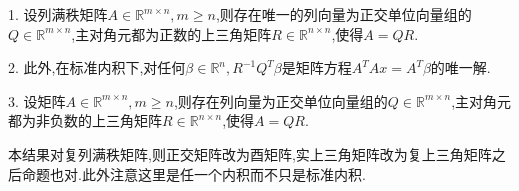 \documentclass[../../main.tex]{subfiles}
\begin{document}
\begin{theorem}\label{theorem:施密特正交化对应的矩阵分解,QR分解}
1. 设列满秩矩阵\( A \in \mathbb{R}^{m \times n}, m \geqslant  n \),则存在唯一的列向量为正交单位向量组的\( Q \in \mathbb{R}^{m \times n} \),主对角元都为正数的上三角矩阵\( R \in \mathbb{R}^{n \times n} \),使得\( A = QR \).

2. 此外,在标准内积下,对任何\( \beta \in \mathbb{R}^n, R^{-1} Q^T \beta \)是矩阵方程\( A^T A x = A^T \beta \)的唯一解.

3. 设矩阵\( A \in \mathbb{R}^{m \times n}, m \geqslant  n \),则存在列向量为正交单位向量组的\( Q \in \mathbb{R}^{m \times n} \),主对角元都为非负数的上三角矩阵\( R \in \mathbb{R}^{n \times n} \),使得\( A = QR \).
\end{theorem}
\begin{note}
本结果对复列满秩矩阵,则正交矩阵改为酉矩阵,实上三角矩阵改为复上三角矩阵之后命题也对.此外注意这里是任一个内积而不只是标准内积.
\end{note}
\end{document}
